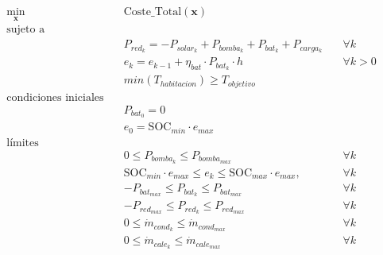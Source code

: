 \begin{align}
	\min_{\mathbf{x}} \quad & \text{Coste\_Total}(\mathbf{x})                                                                                                            \\
	\text{sujeto a} \quad   &                                                                                                                                            \\
	                        & P_{red_k} = -P_{solar_k} + P_{bomba_k} + P_{bat_k} + P_{carga_k} \quad                                                     & \forall k     \\
	                        & e_k = e_{k-1} + \eta_{bat} \cdot P_{bat_k} \cdot h \quad                                                                   & \forall k > 0 \\
	                        & min(T_{habitacion}) \geq T_{objetivo}                                               \label{eq:min_t_habitacion_constraint}                 \\
	\text{condiciones iniciales} \quad                                                                                                                                   \\
	                        & P_{bat_0} = 0                                                                                                                              \\
	                        & e_0 = \text{SOC}_{min} \cdot e_{max}                                                                                                       \\
	\text{límites} \quad    &                                                                                                                                            \\
	                        & 0 \leq P_{bomba_k} \leq P_{bomba_{max}} \quad                                                                              & \forall k     \\
	                        & \text{SOC}_{min} \cdot e_{max} \leq e_k \leq \text{SOC}_{max} \cdot e_{max}, \quad                                         & \forall k     \\
	                        & -P_{bat_{max}} \leq P_{bat_k} \leq P_{bat_{max}} \quad                                                                     & \forall k     \\
	                        & -P_{red_{max}} \leq P_{red_k} \leq P_{red_{max}} \quad                                                                     & \forall k     \\
	                        & 0 \leq \dot{m}_{cond_k} \leq \dot{m}_{cond_{max}} \quad                                                                    & \forall k     \\
	                        & 0 \leq \dot{m}_{cale_k} \leq \dot{m}_{cale_{max}} \quad                                                                    & \forall k
\end{align}


